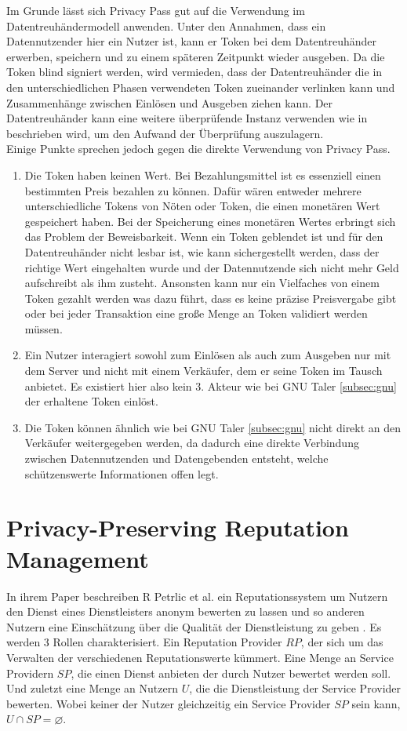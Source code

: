 \documentclass[
	fontsize=12pt,
	headings=small,
	parskip=half,           %
	bibliography=totoc,
	numbers=noenddot,       %
	open=any,               %
]{scrreprt}
\begin{document}
Im Grunde lässt sich Privacy Pass gut auf die Verwendung im Datentreuhändermodell anwenden. Unter den Annahmen, dass ein Datennutzender hier ein Nutzer ist, kann er Token bei dem Datentreuhänder erwerben, speichern und zu einem späteren Zeitpunkt wieder ausgeben. Da die Token blind signiert werden, wird vermieden, dass der Datentreuhänder die in den unterschiedlichen Phasen verwendeten Token zueinander verlinken kann und Zusammenhänge zwischen Einlösen und Ausgeben ziehen kann. Der Datentreuhänder kann eine weitere überprüfende Instanz verwenden wie in \cite{pp-davidson2018privacy} beschrieben wird, um den Aufwand der Überprüfung auszulagern. \\
Einige Punkte sprechen jedoch gegen die direkte Verwendung von Privacy Pass. 
\begin{enumerate}
    \item Die Token haben keinen Wert. Bei Bezahlungsmittel ist es essenziell einen bestimmten Preis bezahlen zu können. Dafür wären entweder mehrere unterschiedliche Tokens von Nöten oder Token, die einen monetären Wert gespeichert haben. Bei der Speicherung eines monetären Wertes erbringt sich das Problem der Beweisbarkeit. Wenn ein Token geblendet ist und für den Datentreuhänder nicht lesbar ist, wie kann sichergestellt werden, dass der richtige Wert eingehalten wurde und der Datennutzende sich nicht mehr Geld aufschreibt als ihm zusteht. Ansonsten kann nur ein Vielfaches von einem Token gezahlt werden was dazu führt, dass es keine präzise Preisvergabe gibt oder bei jeder Transaktion eine große Menge an Token validiert werden müssen.
    \item Ein Nutzer interagiert sowohl zum Einlösen als auch zum Ausgeben nur mit dem Server und nicht mit einem Verkäufer, dem er seine Token im Tausch anbietet. Es existiert hier also kein 3. Akteur wie bei GNU Taler \ref{subsec:gnu} der erhaltene Token einlöst.
    \item Die Token können ähnlich wie bei GNU Taler \ref{subsec:gnu} nicht direkt an den Verkäufer weitergegeben werden, da dadurch eine direkte Verbindung zwischen Datennutzenden und Datengebenden entsteht, welche schützenswerte Informationen offen legt.
\end{enumerate}

\section{Privacy-Preserving Reputation Management}
\label{subsec:rep}
In ihrem Paper beschreiben R Petrlic et al. ein Reputationssystem um Nutzern den Dienst eines Dienstleisters anonym bewerten zu lassen und so anderen Nutzern eine Einschätzung über die Qualität der Dienstleistung zu geben \cite{petrlic2014privacy}. Es werden 3 Rollen charakterisiert. Ein Reputation Provider $RP$, der sich um das Verwalten der verschiedenen Reputationswerte kümmert. Eine Menge an Service Providern $SP$, die einen Dienst anbieten der durch Nutzer bewertet werden soll. Und zuletzt eine Menge an Nutzern $U$, die die Dienstleistung der Service Provider bewerten. Wobei keiner der Nutzer gleichzeitig ein Service Provider $SP$ sein kann, $U \cap SP = \varnothing$. 
\end{document}
